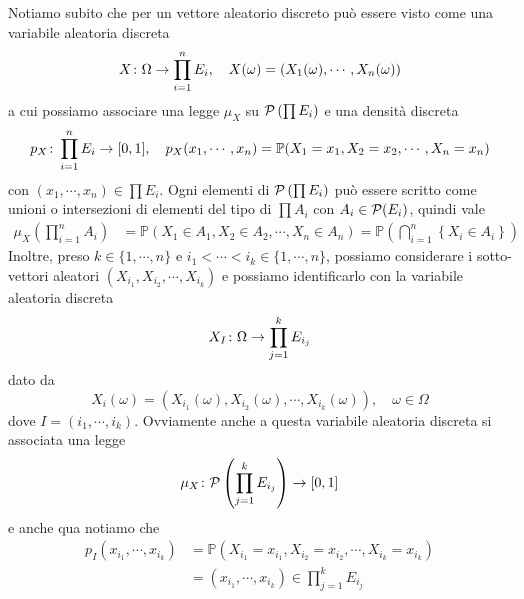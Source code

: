 \documentclass[a4paper]{article}
\begin{document}
Notiamo subito che per un vettore aleatorio discreto
può essere visto come una variabile aleatoria discreta \[
    X \colon \Omega \to \prod_{i=1}^n E_i, \quad
    X(\omega) = (X_1(\omega), \cdots, X_n(\omega))
\]
a cui possiamo associare una legge \(\mu_X\)
su \(\mathcal P\left(\prod E_i\right)\)
e una densità discreta
\[
    p_X \colon \prod_{i=1}^n E_i \to [0,1],
    \quad
    p_X(x_1, \cdots, x_n) = \mathbb P(X_1 = x_1, X_2 = x_2, \cdots, X_n = x_n)
\]
con \((x_1, \cdots, x_n) \in \prod E_i\).
Ogni elementi di \(\mathcal P\left(\prod E_i\right)\)
può essere scritto come unioni o intersezioni di elementi del tipo di
\(\prod A_i\) con \(A_i \in \mathcal P(E_i)\), quindi vale
\begin{align*}
    \mu_X\left(
        \prod_{i=1}^n A_i
    \right)
    &= \mathbb P\left(
        X_1 \in A_1, X_2 \in A_2,
        \cdots, X_n \in A_n
    \right) = \mathbb P\left(
        \bigcap_{i=1}^n \left\{X_i \in A_i\right\}
    \right)
\end{align*}
Inoltre, preso \(k \in \{1, \cdots, n\}\)
e \(i_1 < \cdots < i_k \in \{1, \cdots, n\}\),
possiamo considerare i sotto-vettori aleatori
\((X_{i_1}, X_{i_2}, \cdots, X_{i_k})\) e possiamo identificarlo
con la variabile aleatoria discreta
\[
    X_I \colon \Omega \to \prod_{j=1}^k E_{i_j}
\]
dato da
\[
    X_i(\omega) = \left(
        X_{i_1}(\omega),
        X_{i_2}(\omega),
        \cdots,
        X_{i_k}(\omega)
    \right), \quad \omega \in \Omega
\]
dove \(I=(i_1, \cdots, i_k)\).
Ovviamente anche a questa variabile aleatoria discreta si associata una legge
\[
    \mu_X \colon \mathcal P\left(
        \prod_{j=1}^k E_{i_j}
    \right) \to [0,1]
\]
e anche qua notiamo che
\begin{align*}
    p_I(x_{i_1}, \cdots, x_{i_k})
    &= \mathbb P\left(
        X_{i_1} = x_{i_1},
        X_{i_2} = x_{i_2},
        \cdots,
        X_{i_k} = x_{i_k}
    \right) \\
    &= (x_{i_1}, \cdots, x_{i_k}) \in \prod_{j=1}^k E_{i_j}
\end{align*}
\end{document}
